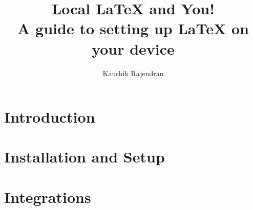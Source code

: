 \documentclass[titlepage]{article}
\title{\textbf{Local \LaTeX{} and You!} \\ A guide to setting up \LaTeX{} on your device}
\author{Kaushik Rajendran}
\begin{document}
\maketitle
\tableofcontents
\newpage

\section{Introduction}

\clearpage

\section{Installation and Setup}



\section{Integrations}

\clearpage
\end{document}
